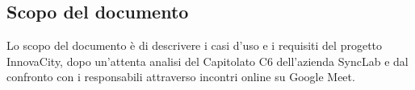 \subsection{Scopo del documento}
Lo scopo del documento è di descrivere i casi d'uso e i requisiti del progetto InnovaCity,
dopo un'attenta analisi del Capitolato C6 dell'azienda SyncLab e dal
confronto con i responsabili attraverso incontri online su Google Meet.